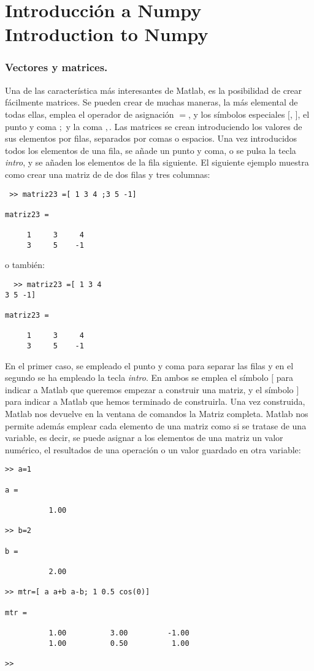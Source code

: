 \chapter{Introducción a Numpy \\ Introduction to Numpy}
\subsection{Vectores y matrices.}   
Una de las característica más interesantes de Matlab, es la posibilidad de crear fácilmente matrices. Se pueden crear de muchas maneras, la más elemental de todas ellas, emplea el operador de asignación $=$, y los símbolos especiales $[$, $]$, el punto y coma $;$ y la coma $,$. Las matrices se crean introduciendo los valores de sus elementos por filas, separados por comas o espacios. Una vez introducidos todos los elementos de una fila, se añade un punto y coma, o se pulsa la tecla \emph{intro}, y se añaden los elementos de la fila siguiente. El siguiente ejemplo muestra como crear una matriz de de dos filas y tres columnas:
\begin{verbatim}
 >> matriz23 =[ 1 3 4 ;3 5 -1]

matriz23 =

     1     3     4
     3     5    -1
\end{verbatim}
o también:
 \begin{verbatim}
  >> matriz23 =[ 1 3 4 
3 5 -1]

matriz23 =

     1     3     4
     3     5    -1
 \end{verbatim}

En el primer caso, se empleado el punto y coma para separar las filas y en el segundo se ha empleado la tecla \emph{intro}.  En ambos se emplea el símbolo $[$ para indicar a Matlab que queremos empezar a construir una matriz, y el símbolo $]$ para indicar a Matlab que hemos terminado de construirla. Una vez construida, Matlab nos devuelve en la ventana de comandos la Matriz completa. Matlab nos permite además emplear cada elemento de una matriz como si se tratase de una variable, es decir, se puede asignar  a los elementos de una matriz un valor numérico, el resultados de una operación o un valor guardado en otra variable:
\begin{verbatim}
>> a=1

a =

          1.00

>> b=2

b =

          2.00

>> mtr=[ a a+b a-b; 1 0.5 cos(0)]

mtr =

          1.00          3.00         -1.00
          1.00          0.50          1.00

>> 
\end{verbatim}

